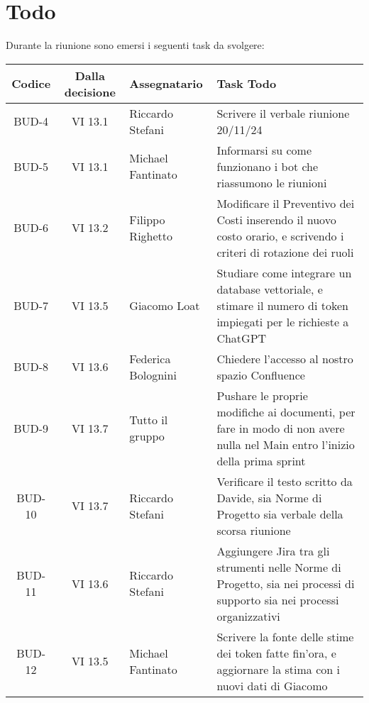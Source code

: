 
\section{Todo}

Durante la riunione sono emersi i seguenti task da svolgere:

\vspace{0.5cm}

\begin{table}[htbp]
\centering
{}
\begin{tabular}{|c|c|p{}|p{}|}
    \hline
    \rowcolor[gray]{0.75}
    \textbf{Codice} & \textbf{Dalla decisione} & \textbf{Assegnatario} & \textbf{Task Todo} \\
    \hline
    BUD-4 & VI 13.1 & Riccardo Stefani & Scrivere il verbale riunione 20/11/24 \\
    \hline
    BUD-5 & VI 13.1 & Michael Fantinato & Informarsi su come funzionano i bot che riassumono le riunioni \\
    \hline
    BUD-6 & VI 13.2 & Filippo Righetto & Modificare il Preventivo dei Costi inserendo il nuovo costo orario, e scrivendo i criteri di rotazione dei ruoli \\
    \hline
    BUD-7 & VI 13.5 & Giacomo Loat & Studiare come integrare un database vettoriale, e stimare il numero di token impiegati per le richieste a ChatGPT \\
    \hline
    BUD-8 & VI 13.6 & Federica Bolognini & Chiedere l'accesso al nostro spazio Confluence \\
    \hline
    BUD-9 & VI 13.7 & Tutto il gruppo & Pushare le proprie modifiche ai documenti, per fare in modo di non avere nulla nel Main entro l'inizio della prima sprint \\
    \hline
    BUD-10 & VI 13.7 & Riccardo Stefani & Verificare il testo scritto da Davide, sia Norme di Progetto sia verbale della scorsa riunione \\
    \hline
    BUD-11 & VI 13.6 & Riccardo Stefani & Aggiungere Jira tra gli strumenti nelle Norme di Progetto, sia nei processi di supporto sia nei processi organizzativi \\
    \hline
    BUD-12 & VI 13.5 & Michael Fantinato & Scrivere la fonte delle stime dei token fatte fin'ora, e aggiornare la stima con i nuovi dati di Giacomo \\
    \hline
\end{tabular}
\end{table}